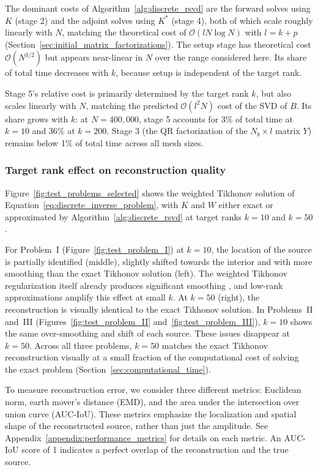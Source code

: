 The dominant costs of Algorithm~\ref{alg:discrete_rsvd} are the forward solves using $K$ (stage 2) and the adjoint solves using $K^*$ (stage 4), both of which scale roughly linearly with $N$, matching the theoretical cost of $\mathcal{O}(l N \log N)$ with $l = k + p$ (Section~\ref{sec:initial_matrix_factorizations}). The setup stage has theoretical cost $\mathcal{O}(N^{3/2})$ but appears near-linear in $N$ over the range considered here. Its share of total time decreases with $k$, because setup is independent of the target rank.

Stage 5's relative cost is primarily determined by the target rank $k$, but also scales linearly with $N$, matching the predicted $\mathcal{O}(l^2 N)$ cost of the SVD of $B$. Its share grows with $k$: at $N = 400{,}000$, stage 5 accounts for 3\% of total time at $k = 10$ and 36\% at $k = 200$. Stage 3 (the QR factorization of the $N_b \times l$ matrix $Y$) remains below 1\% of total time across all mesh sizes.


\subsubsection{Target rank effect on reconstruction quality}\label{sec:target_rank_reconstruction}

Figure~\ref{fig:test_problems_selected} shows the weighted Tikhonov solution of Equation~\eqref{eq:discrete_inverse_problem}, with $K$ and $W$ either exact or approximated by Algorithm~\ref{alg:discrete_rsvd} at target ranks $k = 10$ and $k = 50$.

For Problem~I (Figure~\ref{fig:test_problem_I}) at $k = 10$, the location of the source is partially identified (middle), slightly shifted towards the interior and with more smoothing than the exact Tikhonov solution (left). The weighted Tikhonov regularization itself already produces significant smoothing \cite{elvetunRegularizationOperatorSource2020}, and low-rank approximations amplify this effect at small $k$. At $k = 50$ (right), the reconstruction is visually identical to the exact Tikhonov solution. In Problems~II and~III (Figures~\ref{fig:test_problem_II} and~\ref{fig:test_problem_III}), $k = 10$ shows the same over-smoothing and shift of each source. These issues disappear at $k = 50$. Across all three problems, $k = 50$ matches the exact Tikhonov reconstruction visually at a small fraction of the computational cost of solving the exact problem (Section~\ref{sec:computational_time}).



To measure reconstruction error, we consider three different metrics: Euclidean norm, earth mover's distance (EMD), and the area under the intersection over union curve (AUC-IoU). These metrics emphasize the localization and spatial shape of the reconstructed source, rather than just the amplitude. See Appendix~\ref{appendix:performance_metrics} for details on each metric. An AUC-IoU score of 1 indicates a perfect overlap of the reconstruction and the true source.

